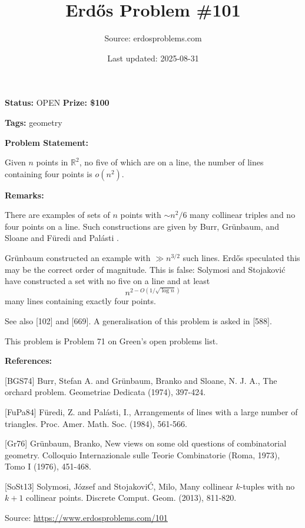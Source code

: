 \documentclass{article}
\title{Erd\H{o}s Problem \#101}
\date{Last updated: 2025-08-31}
\author{Source: erdosproblems.com}
\begin{document}
\maketitle

\noindent\textbf{Status:} OPEN \quad \textbf{Prize: \$100}

\noindent\textbf{Tags:} geometry

\medskip
\noindent\textbf{Problem Statement:}

Given $n$ points in $\mathbb{R}^2$, no five of which are on a line, the number of lines containing four points is $o(n^2)$.

\bigskip
\noindent\textbf{Remarks:}

There are examples of sets of $n$ points with $\sim n^2/6$ many collinear triples and no four points on a line. Such constructions are given by Burr, Gr\"{u}nbaum, and Sloane \cite{BGS74} and F\"{u}redi and Pal\'{a}sti \cite{FuPa84}. 

Gr\"{u}nbaum \cite{Gr76} constructed an example with $\gg n^{3/2}$ such lines. Erd\H{o}s speculated this may be the correct order of magnitude. This is false: Solymosi and Stojakovi\'{c} \cite{SoSt13} have constructed a set with no five on a line and at least\[n^{2-O(1/\sqrt{\log n})}\]many lines containing exactly four points.

See also [102] and [669]. A generalisation of this problem is asked in [588].

This problem is Problem 71 on Green's open problems list.

\bigskip
\noindent\textbf{References:}

[BGS74] Burr, Stefan A. and Gr\"{u}nbaum, Branko and Sloane, N. J. A., The orchard problem. Geometriae Dedicata (1974), 397-424.
 
 [FuPa84] F\"{u}redi, Z. and Pal\'{a}sti, I., Arrangements of lines with a large number of triangles. Proc. Amer. Math. Soc. (1984), 561-566.
 
 [Gr76] Gr\"{u}nbaum, Branko, New views on some old questions of combinatorial geometry. Colloquio Internazionale sulle Teorie Combinatorie
(Roma, 1973), Tomo I (1976), 451-468.
 
 [SoSt13] Solymosi, J\'{o}zsef and Stojakovi\'C, Milo\vS, Many collinear {$k$}-tuples with no {$k+1$} collinear points. Discrete Comput. Geom. (2013), 811-820.

\bigskip
\noindent\small{Source: \url{https://www.erdosproblems.com/101}}
\end{document}
